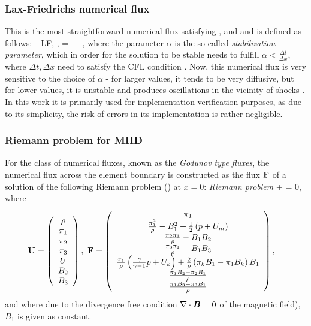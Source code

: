 \subsubsection{Lax-Friedrichs numerical flux}
This is the most straightforward numerical flux satisfying , and  and is defined as follows:
\be
\mrH_{LF}\lo \mrv, \mrw, \bfn\ro = \left[\mrF\lo\mrv\ro + \mrF\lo\mrw\ro\right] - \lo \mrw - \mrv\ro,
\ee
where the parameter $\alpha$ is the so-called \textit{stabilization parameter}, which in order for the solution to be stable needs to fulfill $\alpha < \frac{\Delta t}{\Delta x}$, where $\Delta t, \Delta x$ need to satisfy the CFL condition . Now, this numerical flux is very sensitive to the choice of $\alpha$ - for larger values, it tends to be very diffusive, but for lower values, it is unstable and produces oscillations in the vicinity of shocks \cite{lfunstable}. In this work it is primarily used for implementation verification purposes, as due to its simplicity, the risk of errors in its implementation is rather negligible.

\subsubsection{Riemann problem for MHD}
For the class of numerical fluxes, known as the \textit{Godunov type fluxes}, the numerical flux across the element boundary is constructed as the flux $\mathrm{\mathbf{F}}$ of a solution of the following Riemann problem () at $x = 0$:
\textit{Riemann problem}
\be
\label{Riemann}
 +  = 0,
\ee
where
\begin{align}
\mathrm{\mathbf{U}} & =  \left(\begin{array}{c}\rho \\ \pi_1 \\ \pi_2 \\ \pi_3 \\ U \\ B_2 \\ B_3 \\ \end{array}\right),\ \mathrm{\mathbf{F}} = \left(\begin{array}{c} \pi_1 \\ \frac{\pi_1^2}{\rho} - B_1^2 + \frac12\left( p + U_m\right) \\ \frac{\pi_2 \pi_1}{\rho} - B_1 B_2 \\ \frac{\pi_3 \pi_1}{\rho} - B_1 B_3\\ \frac{\pi_1}{\rho} \left( \frac{\gamma}{\gamma - 1} p + U_k\right) + \frac{2}{\rho} \left( \pi_k B_1 - \pi_1 B_k\right) B_1  \\ \frac{\pi_1 B_2 - \pi_2 B_1}{\rho} \\ \frac{\pi_1 B_3 - \pi_3 B_1}{\rho} \\ \end{array}\right),
\end{align}
and where due to the divergence free condition $\nabla\cdot \mbox{\boldmath $B$} = 0$ of the magnetic field), $B_1$ is given as constant.
